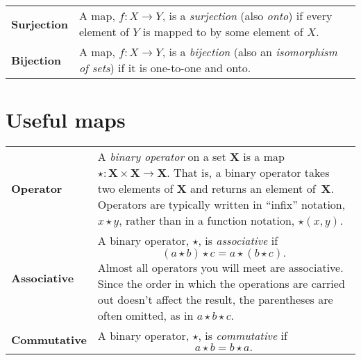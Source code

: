 \documentclass[10pt, a4paper, landscape]{article}
\newcommand{\defn}[1]{\textbf{#1}}
\newcommand{\set}[1]{\mathbold{#1}}
\begin{document}
\begin{multicols*}{3}
\begin{tabularx}{\columnwidth}{@{}l>{\raggedright\arraybackslash}X@{}}
  \defn{Surjection} & A map, $f\colon X \to Y$, is a \emph{surjection} (also \emph{onto}) if every element of $Y$ is mapped to by some element of $X$. \\

  \defn{Bijection} & A map, $f\colon X \to Y$, is a \emph{bijection} (also an \emph{isomorphism of sets}) if it is one-to-one and onto.   
\end{tabularx}


\section*{Useful maps}
\begin{tabularx}{\columnwidth}{@{}l>{\raggedright\arraybackslash}X@{}}
  \toprule
  \defn{Operator} & A \emph{binary operator} on a set $\set{X}$ is a map $\star \colon \set{X}\times\set{X} \to \set{X}$. That is, a binary operator takes two elements of $\set{X}$ and returns an element of~$\set{X}$. Operators are typically written in “infix” notation, $x\star y$, rather than in a function notation, $\star(x,y)$. \\

  \defn{Associative} & A binary operator, $\star$, is \emph{associative} if
  \begin{equation*}
    (a \star b) \star c = a \star (b \star c).
  \end{equation*}
  Almost all operators you will meet are associative. Since the order in which the operations are carried out doesn't affect the result, the parentheses are often omitted, as in $a\star b\star c$.\\
  
  \defn{Commutative} & A binary operator, $\star$, is \emph{commutative} if
  \begin{equation*}
    a \star b = b \star a.
  \end{equation*}
\end{tabularx}



\end{multicols*}
\end{document}
